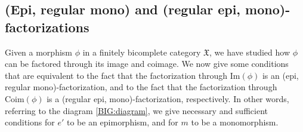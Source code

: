 \documentclass[12pt]{article}
\theoremstyle{definition}
\def\X{\mathfrak X}
\def\Coim{\mathrm{Coim}}
\def\Im{\mathrm{Im}}
\numberwithin{equation}{section}
\begin{document}
\subsection{(Epi, regular mono) and (regular epi, mono)-factorizations}

Given a morphism $\phi$ in a finitely bicomplete category $\X$, we have studied how $\phi$ can be factored through its image and coimage. We now give some conditions that are equivalent to the fact that the factorization through $\Im(\phi)$ is an (epi, regular mono)-factorization, and to the fact that the factorization through $\Coim(\phi)$ is a (regular epi,  mono)-factorization, respectively. In other words, referring to the diagram \eqref{BIG:diagram}, we give necessary and sufficient conditions for $e'$ to be an epimorphism, and for $m$ to be a monomorphism.
\end{document}

